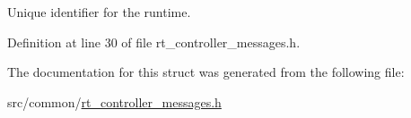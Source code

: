 Unique identifier for the runtime. 



Definition at line 30 of file rt\-\_\-controller\-\_\-messages.\-h.



The documentation for this struct was generated from the following file\-:\begin{DoxyCompactItemize}
\item 
src/common/\hyperlink{rt__controller__messages_8h}{rt\-\_\-controller\-\_\-messages.\-h}\end{DoxyCompactItemize}
